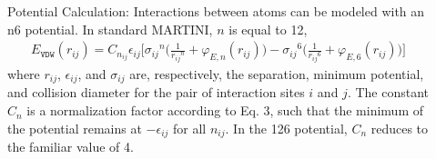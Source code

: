 \documentclass[letterpaper,10pt,english]{sphinxmanual}
\begin{document}
\begin{description}
\item[{}] \leavevmode
\sphinxAtStartPar
Potential Calculation: Interactions between atoms can be modeled with an n\sphinxhyphen{}6 potential. In standard MARTINI, \(n\) is equal to 12,
\begin{equation*}
\begin{split}E_{\texttt{VDW}}(r_{ij}) = C_{n_{ij}}\epsilon_{ij} \Bigg[ {\sigma_{ij}}^{n} \bigg(\frac{1}{{r_{ij}}^{n}} + \varphi_{E, n} (r_{ij}) \bigg) - {\sigma_{ij}}^{6} \bigg(\frac{1}{{r_{ij}}^{6}} + \varphi_{E, 6} (r_{ij}) \bigg) \Bigg]\end{split}
\end{equation*}
\sphinxAtStartPar
where \(r_{ij}\), \(\epsilon_{ij}\), and \(\sigma_{ij}\) are, respectively, the separation, minimum potential, and collision diameter for the pair of interaction sites \(i\) and \(j\). The constant \(C_n\) is a normalization factor according to Eq. 3, such that the minimum of the potential remains at \(-\epsilon_{ij}\) for all \(n_{ij}\). In the 12\sphinxhyphen{}6 potential, \(C_n\) reduces to the familiar value of 4.


\end{description}
\end{document}
